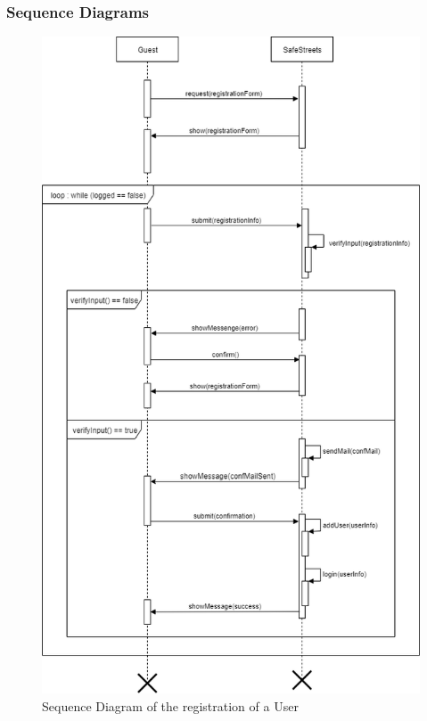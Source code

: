 \subsubsection{Sequence Diagrams}
    \begin{figure}[H]
        \centering
        \includegraphics[scale=0.5]{Images/SeqDiag_registration.png}
        \caption{Sequence Diagram of the registration of a User}
    \end{figure}
    
